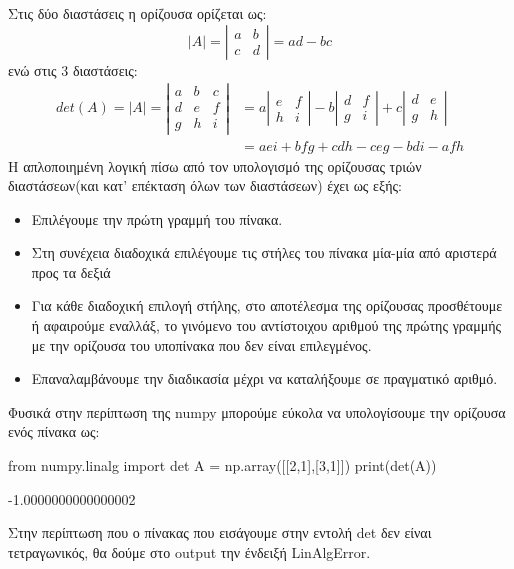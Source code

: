 Στις δύο διαστάσεις η ορίζουσα ορίζεται ως:
\begin{equation}
|A|=\left|\begin{array}{ll}
a & b \\
c & d
\end{array}\right|=a d-b c
\end{equation}
ενώ στις 3 διαστάσεις:
\begin{equation}
\begin{aligned}
det(A)=|A|=\left|\begin{array}{lll}
a & b & c \\
d & e & f \\
g & h & i
\end{array}\right| &=a\left|\begin{array}{cc}
e & f \\
h & i
\end{array}\right|-b\left|\begin{array}{ll}
d & f \\
g & i
\end{array}\right|+c\left|\begin{array}{ll}
d & e \\
g & h
\end{array}\right| \\
&=a e i+b f g+c d h-c e g-b d i-a f h
\end{aligned}
\end{equation}
Η απλοποιημένη λογική πίσω από τον υπολογισμό της ορίζουσας τριών διαστάσεων(και κατ' επέκταση όλων των διαστάσεων) έχει ως εξής:
\begin{itemize}
\item Επιλέγουμε την πρώτη γραμμή του πίνακα.
\item Στη συνέχεια διαδοχικά επιλέγουμε τις στήλες του πίνακα μία-μία από αριστερά προς τα δεξιά
\item Για κάθε διαδοχική επιλογή στήλης, στο αποτέλεσμα της ορίζουσας προσθέτουμε ή αφαιρούμε εναλλάξ, το γινόμενο του αντίστοιχου αριθμού της πρώτης γραμμής με την ορίζουσα του υποπίνακα που δεν είναι επιλεγμένος.
\item Επαναλαμβάνουμε την διαδικασία μέχρι να καταλήξουμε σε πραγματικό αριθμό.
\end{itemize}
Φυσικά στην περίπτωση της {\en numpy} μπορούμε εύκολα να υπολογίσουμε την ορίζουσα ενός πίνακα ως:
\en
\begin{python}
from numpy.linalg import det
A = np.array([[2,1],[3,1]])
print(det(A))
\end{python}
\vspace*{-0.7cm}
\begin{codeout}
-1.0000000000000002
\end{codeout}
\gr
Στην περίπτωση που ο πίνακας που εισάγουμε στην εντολή {\en det} δεν είναι τετραγωνικός, θα δούμε στο {\en output} την ένδειξή {\en LinAlgError}.


